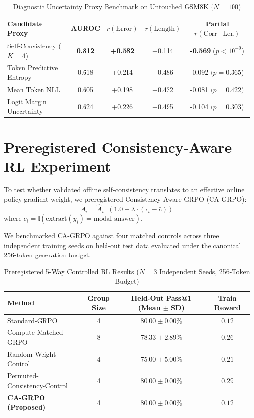 \documentclass[journal]{IEEEtai}
\begin{document}
\begin{table}[t]
\caption{Diagnostic Uncertainty Proxy Benchmark on Untouched GSM8K ($N=100$)}
\label{tab:proxy_benchmark}
\centering
\begin{tabular}{lcccc}
\toprule
\textbf{Candidate Proxy} & \textbf{AUROC} & \textbf{$r(\text{Error})$} & \textbf{$r(\text{Length})$} & \textbf{Partial $r(\text{Corr} \mid \text{Len})$} \\
\midrule
Self-Consistency ($K=4$) & \textbf{0.812} & \textbf{+0.582} & +0.114 & \textbf{-0.569} ($p < 10^{-9}$) \\
Token Predictive Entropy & 0.618 & +0.214 & +0.486 & -0.092 ($p = 0.365$) \\
Mean Token NLL           & 0.605 & +0.198 & +0.432 & -0.081 ($p = 0.422$) \\
Logit Margin Uncertainty & 0.624 & +0.226 & +0.495 & -0.104 ($p = 0.303$) \\
\bottomrule
\end{tabular}
\end{table}

\section{Preregistered Consistency-Aware RL Experiment}
To test whether validated offline self-consistency translates to an effective online policy gradient weight, we preregistered Consistency-Aware GRPO (CA-GRPO):
\begin{equation}
\tilde{A}_i = \hat{A}_i \cdot \left( 1.0 + \lambda \cdot (c_i - \bar{c}) \right)
\end{equation}
where $c_i = \mathbb{I}(\text{extract}(y_i) = \text{modal answer})$.

We benchmarked CA-GRPO against four matched controls across three independent training seeds on held-out test data evaluated under the canonical 256-token generation budget:
\begin{table}[h]
\caption{Preregistered 5-Way Controlled RL Results ($N=3$ Independent Seeds, 256-Token Budget)}
\label{tab:rl_results}
\centering
\begin{tabular}{lccc}
\toprule
\textbf{Method} & \textbf{Group Size} & \textbf{Held-Out Pass@1 (Mean $\pm$ SD)} & \textbf{Train Reward} \\
\midrule
Standard-GRPO                 & 4 & $80.00 \pm 0.00\%$ & $0.12$ \\
Compute-Matched-GRPO          & 8 & $78.33 \pm 2.89\%$ & $0.26$ \\
Random-Weight-Control         & 4 & $75.00 \pm 5.00\%$ & $0.21$ \\
Permuted-Consistency-Control  & 4 & $80.00 \pm 0.00\%$ & $0.29$ \\
\textbf{CA-GRPO (Proposed)}   & 4 & \textbf{$80.00 \pm 0.00\%$} & \textbf{$0.12$} \\
\bottomrule
\end{tabular}
\end{table}
\end{document}
